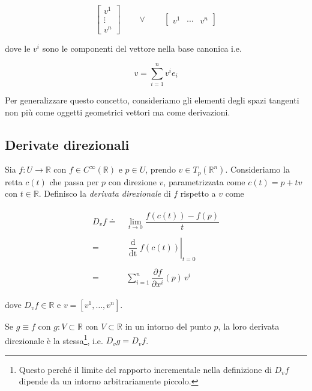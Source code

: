 \begin{equation}
	\begin{bmatrix} v^{1} \\ \vdots \\ v^{n} \end{bmatrix} \qquad \lor \qquad \begin{bmatrix} v^{1} & \cdots & v^{n} \end{bmatrix}
\end{equation}

dove le $ v^{i} $ sono le componenti del vettore nella base canonica i.e.

\begin{equation}
	v = \sum_{i=1}^{n} v^{i} e_{i}
\end{equation}

Per generalizzare questo concetto, consideriamo gli elementi degli spazi tangenti non più come oggetti geometrici vettori ma come derivazioni.

\subsection{Derivate direzionali}

Sia $ f : U \to \mathbb{R} $ con $ f \in C^{\infty}(\mathbb{R}) $ e $ p\in U $, prendo $ v \in T_{p}(\mathbb{R}^{n}) $. Consideriamo la retta $ c(t) $ che passa per $ p $ con direzione $ v $, parametrizzata come $ c(t)=p+tv $ con $ t \in \mathbb{R} $. Definisco la \textit{derivata direzionale} di $ f $ rispetto a $ v $ come

\begin{align}
	\begin{split}
		D_{v} f \doteq& \, \lim_{t \to 0} \dfrac{f(c(t)) - f(p)}{t}\\\\
		=& \, \left. \dfrac{\operatorname{d}}{\operatorname{dt}} f(c(t)) \right|_{t=0}\\\\
		=& \, \sum_{i=1}^{n} \dfrac{\partial f}{\partial x^{i}} (p) \, v^{i}
	\end{split}
\end{align}

dove $ D_{v} f \in \mathbb{R} $ e $ v = [v^{1},\dots,v^{n}] $.

\begin{remark}
	Se $ g \equiv f $ con $ g : V \subset \mathbb{R} $ con $ V \subset \mathbb{R} $ in un intorno del punto $ p $, la loro derivata direzionale è la stessa\footnote{%
		Questo perché il limite del rapporto incrementale nella definizione di $ D_{v} f $ dipende da un intorno arbitrariamente piccolo.%
	}, i.e. $ D_{v} g = D_{v} f $.
\end{remark}

